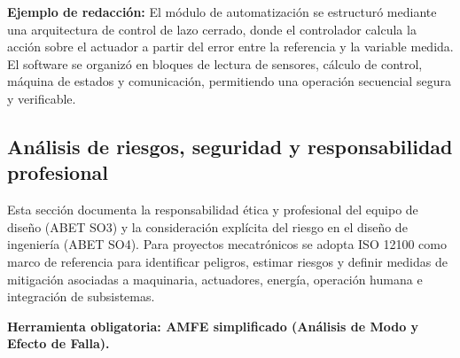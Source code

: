 \documentclass[12pt,letterpaper]{report}
\begin{document}
\begin{instrucciones}
\noindent \textbf{Ejemplo de redacción:} El módulo de automatización se estructuró mediante una arquitectura de control de lazo cerrado, donde el controlador calcula la acción sobre el actuador a partir del error entre la referencia y la variable medida. El software se organizó en bloques de lectura de sensores, cálculo de control, máquina de estados y comunicación, permitiendo una operación secuencial segura y verificable.
\end{instrucciones}


\subsection{Análisis de riesgos, seguridad y responsabilidad profesional}
\begin{instrucciones}
Esta sección documenta la responsabilidad ética y profesional del equipo de diseño (ABET SO3) y la consideración explícita del riesgo en el diseño de ingeniería (ABET SO4). Para proyectos mecatrónicos se adopta ISO 12100 como marco de referencia para identificar peligros, estimar riesgos y definir medidas de mitigación asociadas a maquinaria, actuadores, energía, operación humana e integración de subsistemas.

\vspace{2mm}
\noindent \textbf{Herramienta obligatoria: AMFE simplificado (Análisis de Modo y Efecto de Falla).}


\end{instrucciones}
\end{document}
